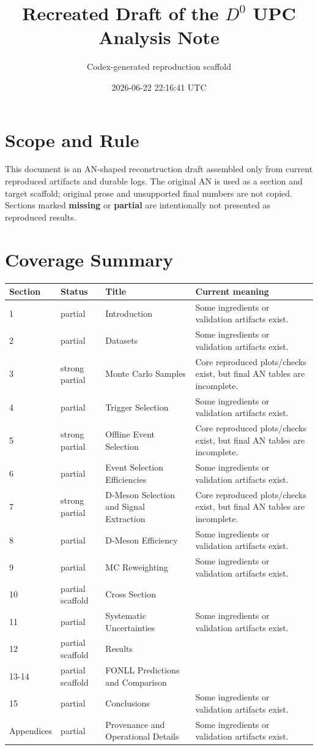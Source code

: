 \documentclass[11pt]{article}
\title{Recreated Draft of the \(D^0\) UPC Analysis Note}
\author{Codex-generated reproduction scaffold}
\date{2026-06-22 22:16:41 UTC}
\begin{document}
\maketitle
\section*{Scope and Rule}
This document is an AN-shaped reconstruction draft assembled only from current reproduced artifacts and durable logs. The original AN is used as a section and target scaffold; original prose and unsupported final numbers are not copied. Sections marked \textbf{missing} or \textbf{partial} are intentionally not presented as reproduced results.
\section*{Coverage Summary}
\begin{center}
\begin{tabular}{lll p{}}
\toprule
Section & Status & Title & Current meaning \\
\midrule
1 & partial & Introduction & Some ingredients or validation artifacts exist. \\
2 & partial & Datasets & Some ingredients or validation artifacts exist. \\
3 & strong partial & Monte Carlo Samples & Core reproduced plots/checks exist, but final AN tables are incomplete. \\
4 & partial & Trigger Selection & Some ingredients or validation artifacts exist. \\
5 & strong partial & Offline Event Selection & Core reproduced plots/checks exist, but final AN tables are incomplete. \\
6 & partial & Event Selection Efficiencies & Some ingredients or validation artifacts exist. \\
7 & strong partial & D-Meson Selection and Signal Extraction & Core reproduced plots/checks exist, but final AN tables are incomplete. \\
8 & partial & D-Meson Efficiency & Some ingredients or validation artifacts exist. \\
9 & partial & MC Reweighting & Some ingredients or validation artifacts exist. \\
10 & partial scaffold & Cross Section &  \\
11 & partial & Systematic Uncertainties & Some ingredients or validation artifacts exist. \\
12 & partial scaffold & Results &  \\
13-14 & partial scaffold & FONLL Predictions and Comparison &  \\
15 & partial & Conclusions & Some ingredients or validation artifacts exist. \\
Appendices & partial & Provenance and Operational Details & Some ingredients or validation artifacts exist. \\
\bottomrule
\end{tabular}
\end{center}
\end{document}
